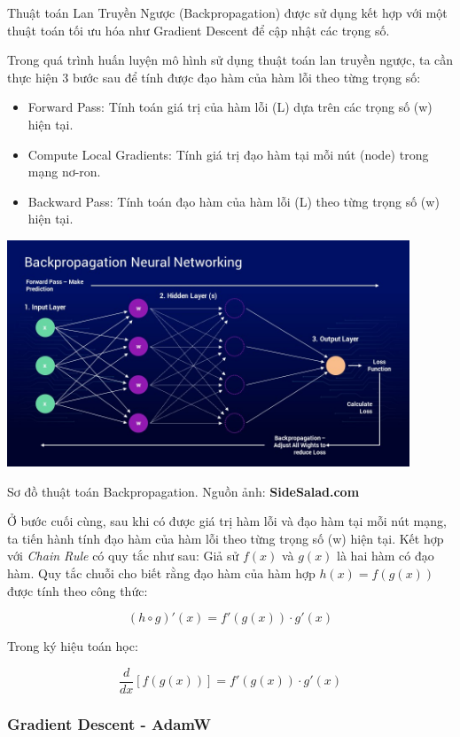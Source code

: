\documentclass[a4paper, 10pt]{article}
\begin{document}
Thuật toán Lan Truyền Ngược (Backpropagation) được sử dụng kết hợp với
một thuật toán tối ưu hóa như Gradient Descent để cập nhật các trọng số.

Trong quá trình huấn luyện mô hình sử dụng thuật toán lan truyền ngược, ta cần 
thực hiện 3 bước sau để tính được đạo hàm của hàm lỗi theo từng trọng số:
\begin{itemize}
    \item Forward Pass: Tính toán giá trị của hàm lỗi (L) dựa trên các trọng số (w) hiện tại.
    \item Compute Local Gradients: Tính giá trị đạo hàm tại mỗi nút (node) trong mạng nơ-ron.
    \item Backward Pass: Tính toán đạo hàm của hàm lỗi (L) theo từng trọng số (w) hiện tại.
\end{itemize}

\begin{minipage}{\linewidth}
    \captionsetup{type=figure}
    \centering
    \includegraphics[width=12cm]{./back-propagation.jpg}
    \caption{Sơ đồ thuật toán Backpropagation. Nguồn ảnh: \textbf{SideSalad.com}}
\end{minipage}

Ở bước cuối cùng, sau khi có được giá trị hàm lỗi và đạo hàm tại mỗi nút mạng, ta tiến hành tính đạo hàm của hàm lỗi theo từng trọng số (w) hiện tại.
Kết hợp với \textit{Chain Rule} có quy tắc như sau:
Giả sử $f(x)$ và $g(x)$ là hai hàm có đạo hàm. Quy tắc chuỗi cho biết rằng đạo hàm của hàm hợp $h(x) = f(g(x))$ được tính theo công thức:

\[
(h \circ g)'(x) = f'(g(x)) \cdot g'(x)
\]

Trong ký hiệu toán học:

\[
\frac{d}{dx}[f(g(x))] = f'(g(x)) \cdot g'(x)
\]
\subsubsection{Gradient Descent - AdamW} 
\end{document}
